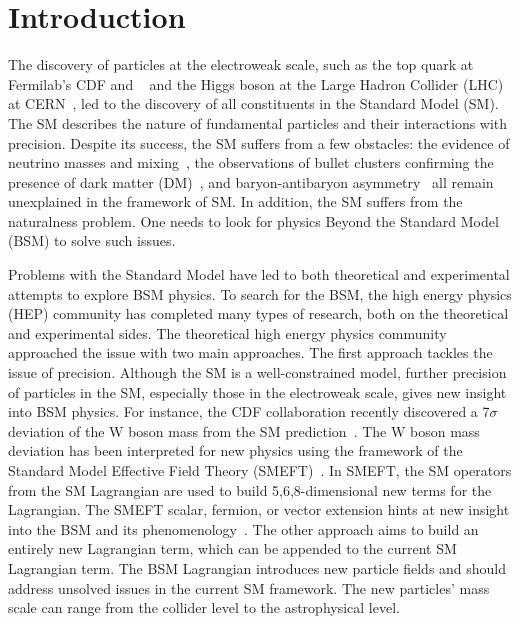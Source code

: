 \chapter{Introduction}\label{sec:introduction}

The discovery of particles at the electroweak scale, such as the top quark at Fermilab's CDF and \DZERO~\cite{topD0,topCDF} and the Higgs boson at the Large Hadron Collider (LHC) at CERN~\cite{higgscms,higgsatlas}, led to the discovery of all constituents in the Standard Model (SM).
The SM describes the nature of fundamental particles and their interactions with precision.
Despite its success, the SM suffers from a few obstacles:
the evidence of neutrino masses and mixing~\cite{neutrino}, the observations of bullet clusters confirming the presence of dark matter (DM)~\cite{Baumgart:2009tn,Kaplan:2009ag,Chan:2011aa,Dienes:2011ja,Dienes:2012yz}, and baryon-antibaryon asymmetry~\cite{Cui:2014twa} all remain unexplained in the framework of SM.
In addition, the SM suffers from the naturalness problem.
One needs to look for physics Beyond the Standard Model (BSM) to solve such issues.

Problems with the Standard Model have led to both theoretical and experimental attempts to explore BSM physics.
To search for the BSM, the high energy physics (HEP) community has completed many types of research, both on the theoretical and experimental sides.
The theoretical high energy physics community approached the issue with two main approaches.
The first approach tackles the issue of precision.
Although the SM is a well-constrained model, further precision of particles in the SM, especially those in the electroweak scale, gives new insight into BSM physics.
For instance, the CDF collaboration recently discovered a 7$\sigma$ deviation of the W boson mass from the SM prediction~\cite{Aaltonen:2022aaa}.
The W boson mass deviation has been interpreted for new physics using the framework of the Standard Model Effective Field Theory (SMEFT)~\cite{Mishima:2022aab}.
In SMEFT, the SM operators from the SM Lagrangian are used to build 5,6,8-dimensional new terms for the Lagrangian.
The SMEFT scalar, fermion, or vector extension hints at new insight into the BSM and its phenomenology~\cite{Mishima:2022aab}.
The other approach aims to build an entirely new Lagrangian term, which can be appended to the current SM Lagrangian term.
The BSM Lagrangian introduces new particle fields and should address unsolved issues in the current SM framework.
The new particles' mass scale can range from the collider level to the astrophysical level.






